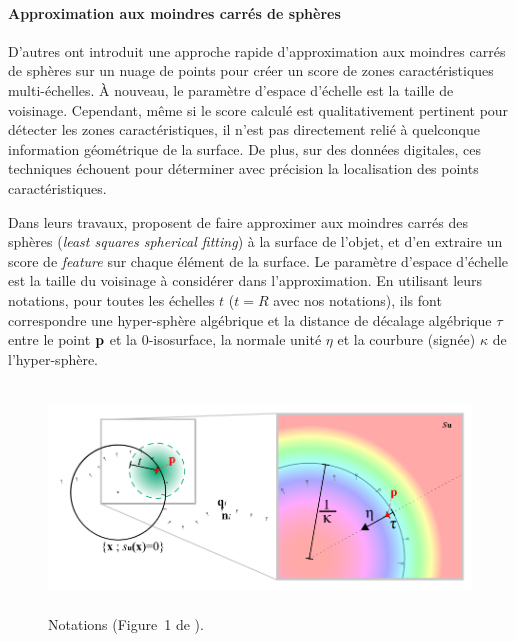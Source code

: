 \paragraph{Approximation aux moindres carrés de sphères}%
\label{sec:applications:feature:growing}
%
D'autres \cite{Mellado2012} ont introduit une approche rapide d'approximation
aux moindres carrés de sphères sur un nuage de points pour créer un score de
zones caractéristiques multi-échelles. À nouveau, le paramètre d'espace d'échelle
est la taille de voisinage. Cependant, même si le score calculé est
qualitativement pertinent pour détecter les zones caractéristiques, il n'est pas
directement relié à quelconque information géométrique de la surface. De plus,
sur des données digitales, ces techniques échouent pour déterminer avec
précision la localisation des points caractéristiques.


Dans leurs travaux,  proposent de faire
approximer aux moindres carrés des sphères (\emph{least squares spherical
fitting}) à la surface de l'objet, et d'en extraire un score de \emph{feature}
sur chaque élément de la surface. Le paramètre d'espace d'échelle est la taille
du voisinage à considérer dans l'approximation. En utilisant leurs notations,
pour toutes les échelles $t$ ($t=R$ avec nos notations), ils font correspondre
une hyper-sphère algébrique et la distance de décalage algébrique $\tau$ entre
le point $\mathbf{p}$ et la $0$-isosurface, la normale unité $\eta$ et la courbure
(signée) $\kappa$ de l'hyper-sphère.

\begin{figure}[ht]{
    \begin{center}
    \includegraphics[height=6cm]{images/Feature/Mellado_notations}
    \end{center}}
    \caption[Notations.]{Notations (Figure~1 de \cite{Mellado2012}).
      \label{fig:mellado-notations}}
\end{figure}

